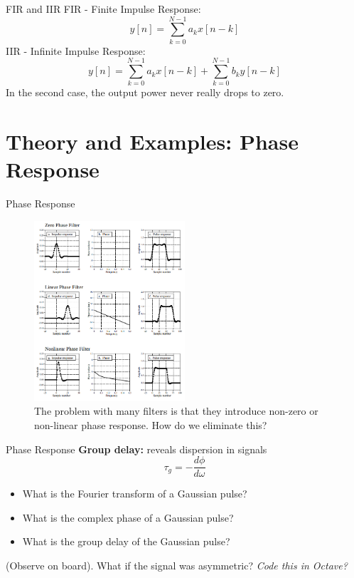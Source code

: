 \documentclass{beamer}
\begin{document}
\begin{frame}[fragile]{FIR and IIR}
FIR - Finite Impulse Response:
\begin{equation}
y[n] = \sum_{k=0}^{N-1} a_k x[n-k]
\end{equation}
IIR - Infinite Impulse Response:
\begin{equation}
y[n] = \sum_{k=0}^{N-1} a_k x[n-k] + \sum_{k=0}^{N-1} b_k y[n-k]
\end{equation}
In the second case, the output power never really drops to zero.
\end{frame}

\section{Theory and Examples: Phase Response}

\begin{frame}{Phase Response}
\small
\begin{figure}
\centering
\includegraphics[width=0.5\textwidth]{figures/phase.png}
\caption{\label{fig:phase} The problem with many filters is that they introduce non-zero or non-linear phase response.  How do we eliminate this?}
\end{figure}
\end{frame}

\begin{frame}{Phase Response}
\textbf{Group delay:} reveals dispersion in signals
\begin{equation}
\tau_g = -\frac{d\phi}{d\omega}
\end{equation}
\begin{itemize}
\item What is the Fourier transform of a Gaussian pulse?
\item What is the complex phase of a Gaussian pulse?
\item What is the group delay of the Gaussian pulse?
\end{itemize}
(Observe on board). What if the signal was asymmetric? \textit{Code this in Octave?}
\end{frame}
\end{document}
